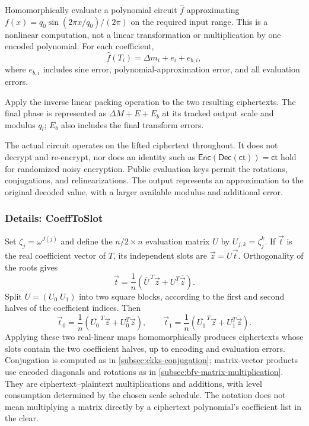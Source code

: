  Homomorphically evaluate a polynomial circuit $\widehat f$ approximating $f(x)=q_0\sin(2\pi x/q_0)/(2\pi)$ on the required input range. This is a nonlinear computation, not a linear transformation or multiplication by one encoded polynomial. For each coefficient,
\[
\widehat f(T_i)=\Delta m_i+e_i+e_{b,i},
\]
where $e_{b,i}$ includes sine error, polynomial-approximation error, and all evaluation errors.

 Apply the inverse linear packing operation to the two resulting ciphertexts. The final phase is represented as $\Delta M+E+E_b$ at its tracked output scale and modulus $q_l$; $E_b$ also includes the final transform errors.

 The actual circuit operates on the lifted ciphertext throughout. It does not decrypt and re-encrypt, nor does an identity such as $\mathsf{Enc}(\mathsf{Dec}(\textsf{ct}))=\textsf{ct}$ hold for randomized noisy encryption. Public evaluation keys permit the rotations, conjugations, and relinearizations. The output represents an approximation to the original decoded value, with a larger available modulus and additional error.

\subsubsection{Details: \textsf{CoeffToSlot}}
\label{subsubsec:ckks-bootstrapping-coefftoslot-details}

Set $\zeta_j=\omega^{J(j)}$ and define the $n/2\times n$ evaluation matrix $U$ by $U_{j,k}=\zeta_j^k$. If $\vec t$ is the real coefficient vector of $T$, its independent slots are $\vec z=U\vec t$. Orthogonality of the roots gives
\[
\vec t=\frac{1}{n}(\overline U^{\,T}\vec z+U^T\overline{\vec z}).
\]
Split $U=(U_0\;U_1)$ into two square blocks, according to the first and second halves of the coefficient indices. Then
\[
\vec t_0=\frac{1}{n}(\overline{U_0}^{\,T}\vec z+U_0^T\overline{\vec z}),\qquad
\vec t_1=\frac{1}{n}(\overline{U_1}^{\,T}\vec z+U_1^T\overline{\vec z}).
\]
Applying these two real-linear maps homomorphically produces ciphertexts whose slots contain the two coefficient halves, up to encoding and evaluation errors. Conjugation is computed as in \autoref{subsec:ckks-conjugation}; matrix-vector products use encoded diagonals and rotations as in \autoref{subsec:bfv-matrix-multiplication}. They are ciphertext--plaintext multiplications and additions, with level consumption determined by the chosen scale schedule. The notation does not mean multiplying a matrix directly by a ciphertext polynomial's coefficient list in the clear.

